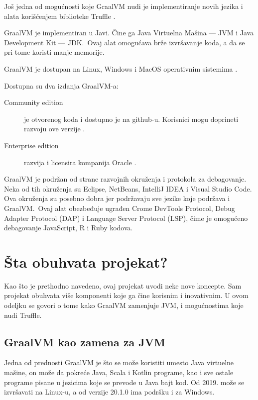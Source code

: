 \documentclass[a4paper]{article}
\begin{document}
Još jedna od mogućnosti koje GraalVM nudi je implementiranje novih jezika i alata korišćenjem biblioteke Truffle \cite{graalvm}.

GraalVM je implementiran u Javi. Čine ga Java Virtuelna Mašina --- JVM i Java Development Kit --- JDK.\ Ovaj alat omogućava brže izvršavanje koda, a da se pri tome koristi manje memorije.

GraalVM je dostupan na Linux, Windows i MacOS operativnim sistemima \cite{graalvm}.

Dostupna su dva izdanja GraalVM-a:

\begin{description}
	\item [Community edition] je otvorenog koda i dostupno je na github-u. Korisnici mogu doprineti razvoju ove verzije \cite{graalvmCommunity}.
	\item [Enterprise edition] razvija i licensira kompanija Oracle \cite{graalvmEnterprise}.
\end{description}

GraalVM je podržan od strane razvojnih okruženja i protokola za debagovanje. Neka od tih okruženja su Eclipse, NetBeans, IntelliJ IDEA i Visual Studio Code. Ova okruženja su posebno dobra jer podržavaju sve jezike koje podržava i GraalVM.\ Ovaj alat obezbeđuje ugrađen Crome DevTools Protocol, Debug Adapter Protocol (DAP) i Language Server Protocol (LSP), čime je omogućeno debagovanje JavaScript, R i Ruby kodova.

\section{Šta obuhvata projekat?}
\label{sec:projekat}

Kao što je prethodno navedeno, ovaj projekat uvodi neke nove koncepte. Sam projekat obuhvata više komponenti koje ga čine korisnim i inovativnim. U ovom odeljku se govori o tome kako GraalVM zamenjuje JVM, i mogućnostima koje nudi Truffle.

\subsection{GraalVM kao zamena za JVM}
\label{sub:GraalVMJVM}

Jedna od prednosti GraalVM je što se može koristiti umesto Java virtuelne mašine, on može da pokreće Java, Scala i Kotlin programe, kao i sve ostale programe pisane u jezicima koje se prevode u Java bajt kod. Od 2019. može se izvršavati na Linux-u, a od verzije 20.1.0 ima podršku i za Windows.
\end{document}
